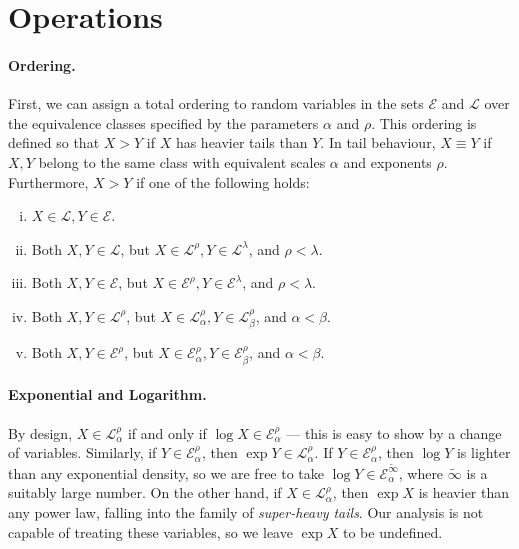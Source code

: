 \documentclass{article}
\theoremstyle{definition}
\begin{document}
\section{Operations}

\paragraph{Ordering.}
First, we can assign a total ordering to random variables in the sets $\mathcal{E}$ and $\mathcal{L}$ over the equivalence classes specified by the parameters $\alpha$ and $\rho$. This ordering is defined so that $X > Y$ if $X$ has heavier tails than $Y$. In tail behaviour, $X \equiv Y$ if $X,Y$ belong to the same class with equivalent scales $\alpha$ and exponents $\rho$. Furthermore, $X > Y$ if one of the following holds:
\begin{enumerate}[(i)]
\item $X \in \mathcal{L}, Y \in \mathcal{E}$.
\item Both $X,Y \in \mathcal{L}$, but $X \in \mathcal{L}^\rho, Y \in \mathcal{L}^\lambda$,  and $\rho < \lambda$.
\item Both $X,Y \in \mathcal{E}$, but $X \in \mathcal{E}^\rho, Y \in \mathcal{E}^\lambda$, and $\rho < \lambda$.
\item Both $X,Y \in \mathcal{L}^\rho$, but $X \in \mathcal{L}_\alpha^\rho, Y \in \mathcal{L}_\beta^\rho$, and $\alpha < \beta$.
\item Both $X,Y \in \mathcal{E}^\rho$, but $X \in \mathcal{E}_\alpha^\rho, Y \in \mathcal{E}_\beta^\rho$, and $\alpha < \beta$.
\end{enumerate}

\paragraph{Exponential and Logarithm.}
By design, $X \in \mathcal{L}_\alpha^\rho$ if and only if $\log X \in \mathcal{E}_\alpha^\rho$ --- this is easy to show by a change of variables. Similarly, if $Y \in \mathcal{E}_\alpha^\rho$, then $\exp Y \in \mathcal{L}_\alpha^\rho$. If $Y \in \mathcal{E}_\alpha^\rho$, then $\log Y$ is lighter than any exponential density, so we are free to take $\log Y \in \mathcal{E}_\alpha^{\tilde{\infty}}$, where $\tilde{\infty}$ is a suitably large number. On the other hand, if $X \in \mathcal{L}_\alpha^\rho$, then $\exp X$ is heavier than any power law, falling into the family of \emph{super-heavy tails}. Our analysis is not capable of treating these variables, so we leave $\exp X$ to be undefined. 
\end{document}
